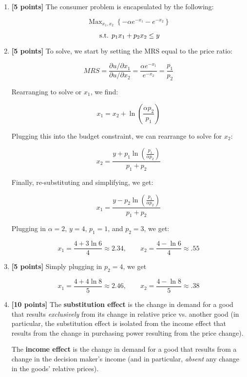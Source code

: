 \documentclass{article}
\newenvironment{solution}{\color{red}}{\color{black}}
\DeclareMathOperator*{\Max}{Max}
\newcommand{\st}{\hbox{ s.t. }}
\begin{document}
\begin{solution}
\begin{enumerate}
\item \textbf{[5 points]} The consumer problem is encapsulated by the following:

\[ \Max_{x_1, x_2} \left\{ - \alpha e^{-x_1} - e^{-x_2} \right\} \]

\[ \st p_1 x_1 + p_2 x_2 \leq y \]

\item \textbf{[5 points]} To solve, we start by setting the MRS equal to the price ratio:

\[ MRS = \frac{\partial u / \partial x_1}{\partial u / \partial x_2} = \frac{\alpha e^{- x_1}}{e^{-x_2}} = \frac{p_1}{p_2} \]

Rearranging to solve or $x_1$, we find:

\[ x_1 = x_2 + \ln \left( \frac{\alpha p_2}{p_1} \right) \]

Plugging this into the budget constraint, we can rearrange to solve for $x_2$:

\[ x_2 = \frac{y + p_1 \ln \left( \frac{p_1}{\alpha p_2} \right)}{p_1 + p_2} \]

Finally, re-substituting and simplifying, we get:

\[ x_1 = \frac{y - p_2 \ln \left( \frac{p_1}{\alpha p_2} \right)}{p_1 + p_2} \]

Plugging in $\alpha = 2$, $y = 4$, $p_1 = 1$, and $p_2 = 3$, we get:

\[ x_1 =  \frac{4 + 3 \ln 6}4 \approx 2.34, \qquad x_2 = \frac{4 - \ln 6}4 \approx .55 \]

\item \textbf{[5 points]} Simply plugging in $p_2 = 4$, we get

\[ x_1 =  \frac{4 + 4 \ln 8}5 \approx 2.46, \qquad x_2 = \frac{4 - \ln 8}5 \approx .38 \]

\item \textbf{[10 points]} The \textbf{substitution effect} is the change in demand for a good that results \emph{exclusively} from its change in relative price vs. another good (in particular, the substitution effect is isolated from the income effect that results from the change in purchasing power resulting from the price change).

The \textbf{income effect} is the change in demand for a good that results from a change in the decision maker's income (and in particular, \emph{absent} any change in the goods' relative prices).


\end{enumerate}
\end{solution}
\end{document}
